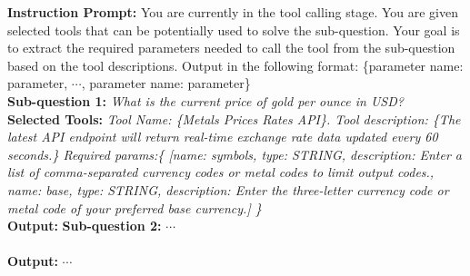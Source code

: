 \documentclass{article}
\begin{document}
\begin{tcolorbox}[title=An Example for Tool Calling with GPT-4]
\small
{}
\textbf{Instruction Prompt:} You are currently in the tool calling stage. You are given selected tools that can be potentially used to solve the sub-question. Your goal is to extract the required parameters needed to call the tool from the sub-question based on the tool descriptions. Output in the following format: \{parameter name: parameter, $\cdots$, parameter name: parameter\}\\
\textbf{Sub-question 1:} \emph{What is the current price of gold per ounce in USD?} \\
\textbf{Selected Tools:} \emph{Tool Name: \{Metals Prices Rates API\}.
Tool description: \{The latest API endpoint will return real-time exchange rate data updated every 60 seconds.\}
Required params:\{
[{name: symbols, type: STRING, description: Enter a list of comma-separated currency codes or metal codes to limit output codes.}, {name: base, type: STRING, description: Enter the three-letter currency code or metal code of your preferred base currency.}]
\}}\\
\textbf{Output:} 
\color{black}\textbf{Sub-question 2:} {$\cdots$} \\
\color{black}{\quad \quad \quad \quad \quad \quad \quad \quad \quad \quad \quad \quad $\vdots$} \\
\color{black}\textbf{Output:} {$\cdots$}
\end{tcolorbox}
\end{document}
